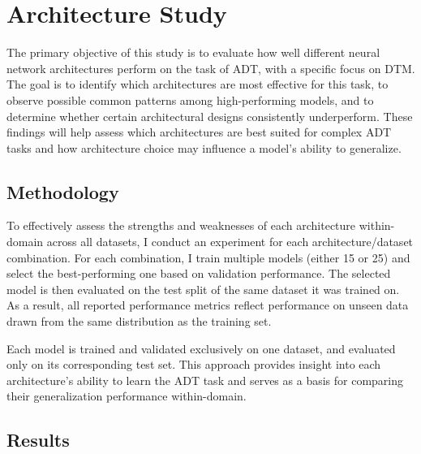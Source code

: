 \chapter{Architecture Study}\label{Study1}

The primary objective of this study is to evaluate how well different neural network architectures perform on the task of \acrfull{ADT}, with a specific focus on \acrfull{DTM}. The goal is to identify which architectures are most effective for this task, to observe possible common patterns among high-performing models, and to determine whether certain architectural designs consistently underperform. These findings will help assess which architectures are best suited for complex \gls{ADT} tasks and how architecture choice may influence a model's ability to generalize.

\section{Methodology}

To effectively assess the strengths and weaknesses of each architecture within-domain across all datasets, I conduct an experiment for each architecture/dataset combination. For each combination, I train multiple models (either 15 or 25) and select the best-performing one based on validation performance. The selected model is then evaluated on the test split of the same dataset it was trained on. As a result, all reported performance metrics reflect performance on unseen data drawn from the same distribution as the training set. 

Each model is trained and validated exclusively on one dataset, and evaluated only on its corresponding test set. This approach provides insight into each architecture's ability to learn the \gls{ADT} task and serves as a basis for comparing their generalization performance within-domain.

\section{Results}	

